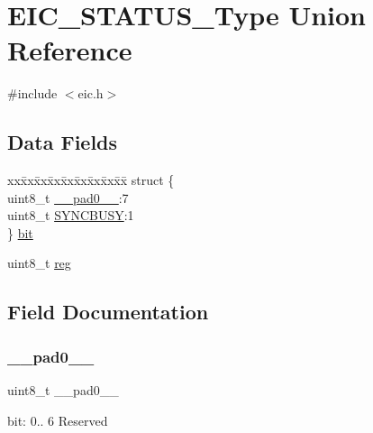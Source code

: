 \hypertarget{union_e_i_c___s_t_a_t_u_s___type}{}\section{E\+I\+C\+\_\+\+S\+T\+A\+T\+U\+S\+\_\+\+Type Union Reference}
\label{union_e_i_c___s_t_a_t_u_s___type}


{\ttfamily \#include $<$eic.\+h$>$}

\subsection*{Data Fields}
\begin{DoxyCompactItemize}
\item 
\begin{tabbing}
xx\=xx\=xx\=xx\=xx\=xx\=xx\=xx\=xx\=\kill
struct \{\\
\>uint8\_t \mbox{\hyperlink{union_e_i_c___s_t_a_t_u_s___type_a8b4eebe79ded0459acec2f4950102ba3}{\_\_pad0\_\_}}:7\\
\>uint8\_t \mbox{\hyperlink{union_e_i_c___s_t_a_t_u_s___type_abb30254758e23bd24824e436a1aa8716}{SYNCBUSY}}:1\\
\} \mbox{\hyperlink{union_e_i_c___s_t_a_t_u_s___type_a2a288b15c8930689718e9dddec30812b}{bit}}\\

\end{tabbing}\item 
uint8\+\_\+t \mbox{\hyperlink{union_e_i_c___s_t_a_t_u_s___type_a9428adc9af4653a2050e2536b55dec8d}{reg}}
\end{DoxyCompactItemize}


\subsection{Field Documentation}
\mbox{\label{union_e_i_c___s_t_a_t_u_s___type_a8b4eebe79ded0459acec2f4950102ba3}} 
\subsubsection{\texorpdfstring{\_\_pad0\_\_}{\_\_pad0\_\_}}
{\footnotesize\ttfamily uint8\+\_\+t \+\_\+\+\_\+pad0\+\_\+\+\_\+}

bit\+: 0.. 6 Reserved \mbox{\label{union_e_i_c___s_t_a_t_u_s___type_a2a288b15c8930689718e9dddec30812b}} 
